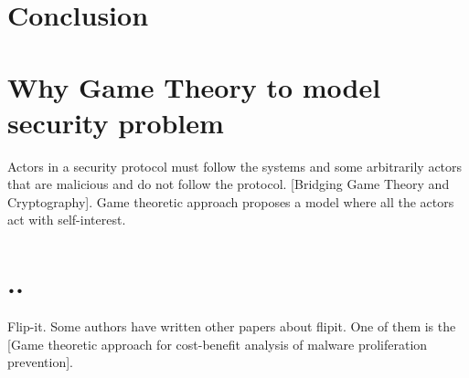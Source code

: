 \section{Conclusion}

\section{Why Game Theory to model security problem}
Actors in a security protocol must follow the systems and some arbitrarily actors that are malicious and do not follow the protocol. [Bridging Game Theory and Cryptography]. Game theoretic approach proposes a model where all the actors act with self-interest. 

\section{..}

Flip-it. Some authors have written other papers about flipit. One of them is the [Game theoretic approach for cost-benefit analysis of malware proliferation prevention]. 





